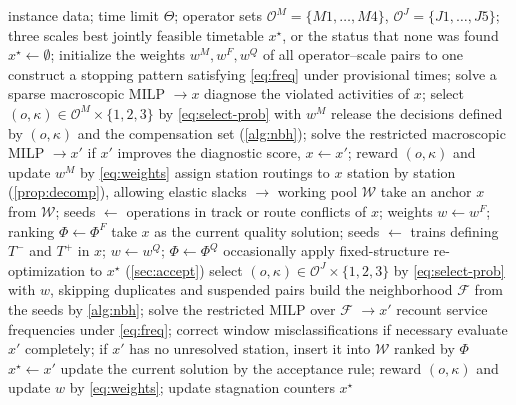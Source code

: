 \begin{algorithm}[tbp]
\caption{Conflict-driven adaptive large neighborhood search (CD-ALNS)}\label{alg:cdalns}
\small
\begin{algorithmic}[1]
\Require instance data; time limit $\Theta$; operator sets $\mathcal{O}^M=\{M1,\dots,M4\}$, $\mathcal{O}^J=\{J1,\dots,J5\}$; three scales
\Ensure best jointly feasible timetable $x^\star$, or the status that none was found
\State $x^\star\gets\emptyset$; initialize the weights $w^M,w^F,w^Q$ of all operator--scale pairs to one
\State construct a stopping pattern satisfying \eqref{eq:freq} under provisional times; solve a sparse macroscopic MILP $\to x$ 
 
  \State diagnose the violated activities of $x$; select $(o,\kappa)\in\mathcal{O}^M\times\{1,2,3\}$ by \eqref{eq:select-prob} with $w^M$
  \State release the decisions defined by $(o,\kappa)$ and the compensation set (\cref{alg:nbh}); solve the restricted macroscopic MILP $\to x'$
  \State if $x'$ improves the diagnostic score, $x\gets x'$; reward $(o,\kappa)$ and update $w^M$ by \eqref{eq:weights}
\EndWhile
\State assign station routings to $x$ station by station (\cref{prop:decomp}), allowing elastic slacks $\to$ working pool $\mathcal{W}$
   
    \State take an anchor $x$ from $\mathcal{W}$; seeds $\gets$ operations in track or route conflicts of $x$; weights $w\gets w^F$; ranking $\Phi\gets\Phi^F$
  \Else {}
    \State take $x$ as the current quality solution; seeds $\gets$ trains defining $T^-$ and $T^+$ in $x$; $w\gets w^Q$; $\Phi\gets\Phi^Q$
    \State occasionally apply fixed-structure re-optimization to $x^\star$ (\cref{sec:accept})
  \EndIf
  \State select $(o,\kappa)\in\mathcal{O}^J\times\{1,2,3\}$ by \eqref{eq:select-prob} with $w$, skipping duplicates and suspended pairs
  \State build the neighborhood $\mathcal{F}$ from the seeds by \cref{alg:nbh}; solve the restricted MILP over $\mathcal{F}$ $\to x'$ 
  \State recount service frequencies under \eqref{eq:freq}; correct window misclassifications if necessary
  \State evaluate $x'$ completely; if $x'$ has no unresolved station, insert it into $\mathcal{W}$ ranked by $\Phi$
    \State $x^\star\gets x'$ 
  \EndIf
  \State update the current solution by the acceptance rule; reward $(o,\kappa)$ and update $w$ by \eqref{eq:weights}; update stagnation counters
\EndWhile
\State \Return $x^\star$
\end{algorithmic}
\end{algorithm}

